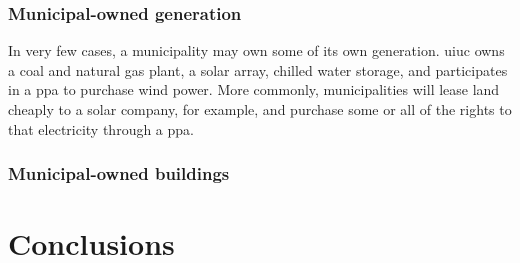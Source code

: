 \subsection{Municipal-owned generation}
In very few cases, a municipality may own some of its own generation. \ac{uiuc}
owns a coal and natural gas plant, a solar array, chilled water storage, and
participates in a \ac{ppa} to purchase wind power. More commonly, municipalities
will lease land cheaply to a solar company, for example, and purchase some or all
of the rights to that electricity through a \ac{ppa}. 

\subsection{Municipal-owned buildings}

\fi

\chapter{Conclusions}
